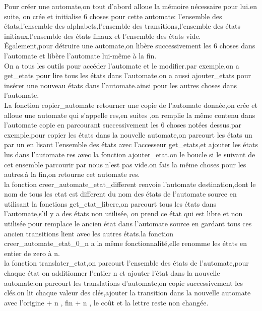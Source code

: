 \documentclass{report}
\begin{document}
Pour créer une automate,on tout d'abord alloue la mémoire nécessaire pour lui.en suite, on crée et initialise 6 choses pour cette automate: l'ensemble des états,l'ensemble des alphabets,l'ensemble des transitions,l'ensemble des états initiaux,l'ensemble des états finaux et l'ensemble des états vide.\\

Également,pour détruire une automate,on libère successivement les 6 choses dans l'automate et libère l'automate lui-même à la fin.\\

On a tous les outils pour accéder l'automate et le modifier.par exemple,on a get\_etats pour lire tous les états dans l'automate.on a aussi ajouter\_etats pour insérer une nouveau états dans l'automate.ainsi pour les autres choses dans l'automate.\\

La fonction copier\_automate retourner une copie de l'automate donnée,on crée et alloue une automate qui s'appelle res,en suites ,on remplie la même contenu  dans l'automate copie en parcourant successivement les 6 choses notées dessus.par exemple,pour copier les états dans la nouvelle automate,on parcourt les états un par un en lisant l'ensemble des états avec l'accesseur get\_etats,et ajouter les états lus dans l'automate res avec la fonction ajouter\_etat.on le boucle si le suivant de cet ensemble parcourir par nous n'est pas vide.on fais la même choses pour les autres.à la fin,on retourne cet automate res.\\

la fonction creer\_automate\_etat\_different renvoie l'automate destination,dont le nom de tous les etat est different du nom des états de l'automate source en utilisant la fonctions get\_etat\_libere,on parcourt tous les états dans l'automate,s'il y a des états non utilisée, on prend ce état qui est libre et non utilisée pour remplace le ancien état dans l'automate source en gardant tous ces ancien transitions lient avec les autres états.la fonction creer\_automate\_etat\_0\_n a la même fonctionnalité,elle renomme les états en entier de zero à n.\\

la fonction translater\_etat,on parcourt l'ensemble des états de l'automate,pour chaque  état on additionner l'entier n et ajouter l’état dans la nouvelle automate.on parcourt les translations d'automate,on copie successivement les clés.on lit chaque valeur des clés,ajouter la transition dans la nouvelle automate avec l'origine + n , fin + n , le coût et la lettre reste non changée.\\
\end{document}
